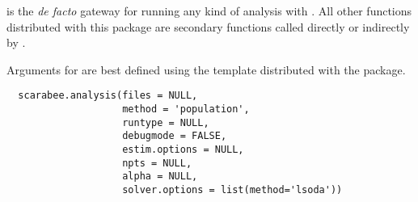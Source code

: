 %
\begin{Description}\relax
{} is the \emph{de facto} gateway for running any kind 
of analysis with . All other functions distributed with this
package are secondary functions called directly or indirectly by
.

Arguments for  are best defined using the template
distributed with the package.

\end{Description}
%
\begin{Usage}
\begin{verbatim}
  scarabee.analysis(files = NULL,
                    method = 'population',
                    runtype = NULL,
                    debugmode = FALSE,
                    estim.options = NULL,
                    npts = NULL,
                    alpha = NULL,
                    solver.options = list(method='lsoda'))
\end{verbatim}
\end{Usage}
%
